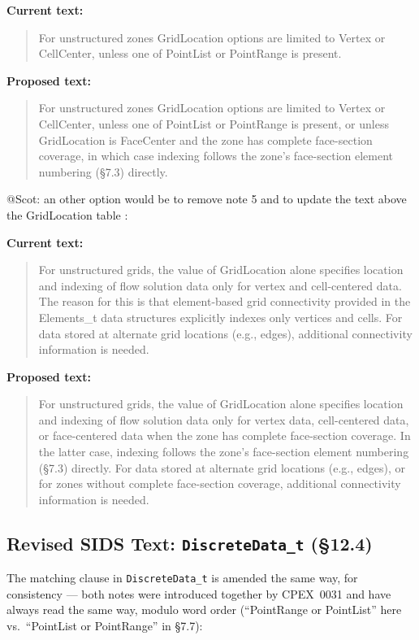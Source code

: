 \documentclass[11pt,letterpaper]{article}
\newenvironment{sidsold}{%
  \par\vspace{0.6em}\noindent
  \begin{quote}\color{black!55}\ttfamily\small\itshape
}{%
  \end{quote}\vspace{-0.2em}
}
\newenvironment{sidsnew}{%
  \par\noindent
  \begin{quote}\color{cgnsblue!85}\ttfamily\small\bfseries
}{%
  \end{quote}\vspace{0.6em}
}
\begin{document}
\textbf{Current text:}
\begin{sidsold}
For unstructured zones GridLocation options are limited to Vertex or
CellCenter, unless one of PointList or PointRange is present.
\end{sidsold}

\textbf{Proposed text:}
\begin{sidsnew}
For unstructured zones GridLocation options are limited to Vertex or
CellCenter, unless one of PointList or PointRange is present,
{\color{cgnsgold}or unless GridLocation is FaceCenter and the zone has
complete face-section coverage, in which case indexing follows the
zone's face-section element numbering (\S7.3) directly.}
\end{sidsnew}

@Scot: an other option would be to remove note 5 and to update the text above
the GridLocation table : 

\textbf{Current text:}
\begin{sidsold}
For unstructured grids, the value of GridLocation alone specifies location
and indexing of flow solution data only for vertex and cell-centered data.
The reason for this is that element-based grid connectivity provided in the
Elements\_t data structures explicitly indexes only vertices and cells.
For data stored at alternate grid locations (e.g., edges), additional
connectivity information is needed. 
\end{sidsold}

\textbf{Proposed text:}
\begin{sidsnew}
For unstructured grids, the value of GridLocation alone specifies location
and indexing of flow solution data only for vertex data, {\color{cgnsgold}
cell-centered data, or face-centered data when the zone has complete face-section
coverage. In the latter case, indexing follows the zone's face-section element
numbering (\S7.3) directly}.
For data stored at alternate grid locations (e.g., edges),  {\color{cgnsgold}
or for zones without complete face-section coverage}, additional connectivity
information is needed. 
\end{sidsnew}

\subsection{Revised SIDS Text: \texttt{DiscreteData\_t} (\S12.4)}
\label{sec:discretedata-redline}

The matching clause in \texttt{DiscreteData\_t} is amended the same way,
for consistency --- both notes were introduced together by CPEX~0031 and
have always read the same way, modulo word order (``PointRange or
PointList'' here vs.\ ``PointList or PointRange'' in \S7.7):
\end{document}
